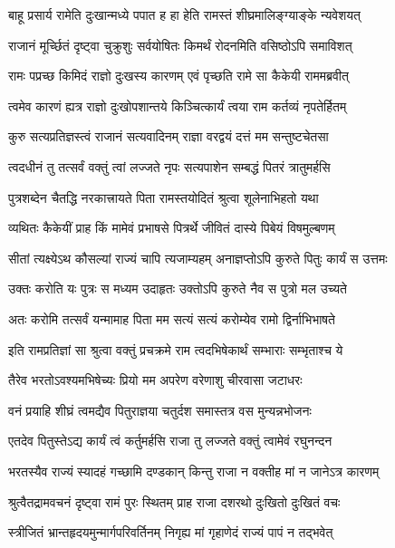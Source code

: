 \twolineshloka
{बाहू प्रसार्य रामेति दुःखान्मध्ये पपात ह}
{हा हेति रामस्तं शीघ्रमालिङ्ग्याङ्के न्यवेशयत्} %

\twolineshloka
{राजानं मूर्च्छितं दृष्ट्वा चुक्रुशुः सर्वयोषितः}
{किमर्थं रोदनमिति वसिष्ठोऽपि समाविशत्} %

\twolineshloka
{रामः पप्रच्छ किमिदं राज्ञो दुःखस्य कारणम्}
{एवं पृच्छति रामे सा कैकेयी राममब्रवीत्} %

\twolineshloka
{त्वमेव कारणं ह्यत्र राज्ञो दुःखोपशान्तये}
{किञ्चित्कार्यं त्वया राम कर्तव्यं नृपतेर्हितम्} %

\twolineshloka
{कुरु सत्यप्रतिज्ञस्त्वं राजानं सत्यवादिनम्}
{राज्ञा वरद्वयं दत्तं मम सन्तुष्टचेतसा} %

\twolineshloka
{त्वदधीनं तु तत्सर्वं वक्तुं त्वां लज्जते नृपः}
{सत्यपाशेन सम्बद्धं पितरं त्रातुमर्हसि} %

\twolineshloka
{पुत्रशब्देन चैतद्धि नरकात्त्रायते पिता}
{रामस्तयोदितं श्रुत्वा शूलेनाभिहतो यथा} %

\twolineshloka
{व्यथितः कैकेयीं प्राह किं मामेवं प्रभाषसे}
{पित्रर्थे जीवितं दास्ये पिबेयं विषमुल्बणम्} %

\twolineshloka
{सीतां त्यक्ष्येऽथ कौसल्यां राज्यं चापि त्यजाम्यहम्}
{अनाज्ञप्तोऽपि कुरुते पितुः कार्यं स उत्तमः} %

\twolineshloka
{उक्तः करोति यः पुत्रः स मध्यम उदाहृतः}
{उक्तोऽपि कुरुते नैव स पुत्रो मल उच्यते} %

\twolineshloka
{अतः करोमि तत्सर्वं यन्मामाह पिता मम}
{सत्यं सत्यं करोम्येव रामो द्विर्नाभिभाषते} %

\twolineshloka
{इति रामप्रतिज्ञां सा श्रुत्वा वक्तुं प्रचक्रमे}
{राम त्वदभिषेकार्थं सम्भाराः सम्भृताश्च ये} %

\twolineshloka
{तैरेव भरतोऽवश्यमभिषेच्यः प्रियो मम}
{अपरेण वरेणाशु चीरवासा जटाधरः} %

\twolineshloka
{वनं प्रयाहि शीघ्रं त्वमद्यैव पितुराज्ञया}
{चतुर्दश समास्तत्र वस मुन्यन्नभोजनः} %

\twolineshloka
{एतदेव पितुस्तेऽद्य कार्यं त्वं कर्तुमर्हसि}
{राजा तु लज्जते वक्तुं त्वामेवं रघुनन्दन} %


\twolineshloka
{भरतस्यैव राज्यं स्यादहं गच्छामि दण्डकान्}
{किन्तु राजा न वक्तीह मां न जानेऽत्र कारणम्} %

\twolineshloka
{श्रुत्वैतद्रामवचनं दृष्ट्वा रामं पुरः स्थितम्}
{प्राह राजा दशरथो दुःखितो दुःखितं वचः} %

\twolineshloka
{स्त्रीजितं भ्रान्तहृदयमुन्मार्गपरिवर्तिनम्}
{निगृह्य मां गृहाणेदं राज्यं पापं न तद्भवेत्} %

